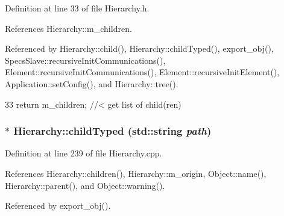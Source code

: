 Definition at line 33 of file Hierarchy.h.

References Hierarchy::m\_\-children.

Referenced by Hierarchy::child(), Hierarchy::childTyped(), export\_\-obj(), SpecsSlave::recursiveInitCommunications(), Element::recursiveInitCommunications(), Element::recursiveInitElement(), Application::setConfig(), and Hierarchy::tree().


\begin{DoxyCode}
33 { return m_children;  } //< get list of child(ren)
\end{DoxyCode}
\hypertarget{classHierarchy_a0c15a5276a3b80b4354d6bd8a01e0708}{
\subsubsection[{childTyped}]{ $\ast$ Hierarchy::childTyped (std::string {\em path})}}
\label{classHierarchy_a0c15a5276a3b80b4354d6bd8a01e0708}


Definition at line 239 of file Hierarchy.cpp.

References Hierarchy::children(), Hierarchy::m\_\-origin, Object::name(), Hierarchy::parent(), and Object::warning().

Referenced by export\_\-obj().



